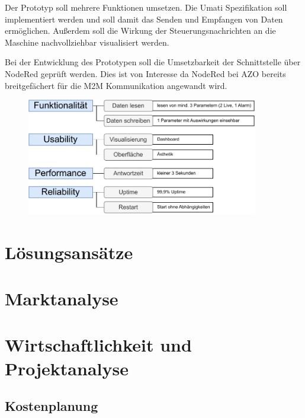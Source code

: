 \documentclass[a4paper, 12pt, oneside]{scrbook}
\begin{document}
		Der Prototyp soll mehrere Funktionen umsetzen. Die Umati Spezifikation soll implementiert werden und soll damit das Senden und Empfangen von Daten ermöglichen. Außerdem soll die Wirkung der Steuerungsnachrichten an die Maschine nachvollziehbar visualisiert werden. %
		
		Bei der Entwicklung des Prototypen soll die Umsetzbarkeit der Schnittstelle über NodeRed geprüft werden. Dies ist von Interesse da NodeRed bei AZO bereits breitgefächert für die M2M Kommunikation angewandt wird. %
		
		\begin{figure}[H]
			\centering
			\includegraphics[width=0.9\textwidth]{res/analysen/Evaluation.pdf}
			\caption{}%
			\label{fig:evaluation}
		\end{figure}
		
	
	\section{Lösungsansätze}
	
		
	
	\section{Marktanalyse}
	
	
	\section{Wirtschaftlichkeit und Projektanalyse}
	
		\subsection{Kostenplanung}
		
\end{document}

